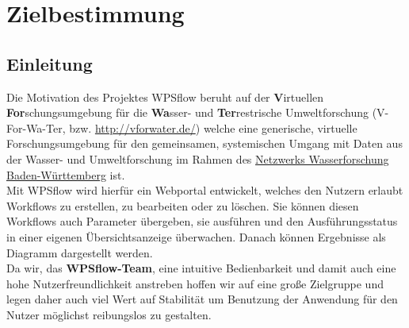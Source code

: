 
 
	\chapter{Zielbestimmung}
	
	    \section{Einleitung}
		    Die Motivation des Projektes WPSflow beruht auf der \textbf{V}irtuellen \textbf{For}schungsumgebung für die \textbf{Wa}sser- und \textbf{Ter}restrische Umweltforschung (V-For-Wa-Ter, bzw. \url{http://vforwater.de/}) welche eine generische, virtuelle Forschungsumgebung für den gemeinsamen, systemischen Umgang mit Daten aus der Wasser- und Umweltforschung im Rahmen des \href{http://www.wassernetzwerk-bw.de/}{Netzwerks Wasserforschung Baden-Württemberg} ist.\\
		    Mit WPSflow wird hierfür ein Webportal entwickelt, welches den Nutzern erlaubt \Gls{Workflow}s zu erstellen, zu bearbeiten oder zu löschen. Sie können diesen Workflows auch Parameter übergeben, sie ausführen und den Ausführungsstatus in einer eigenen Übersichtsanzeige überwachen. Danach können Ergebnisse als Diagramm dargestellt werden.\\
		    Da wir, das \textbf{WPSflow-Team}, eine intuitive Bedienbarkeit und damit auch eine hohe Nutzerfreundlichkeit anstreben hoffen wir auf eine große Zielgruppe und legen daher auch viel Wert auf Stabilität um Benutzung der Anwendung für den Nutzer möglichst reibungslos zu gestalten.
		    
		    \vspace{.5cm}
		    
	    
	    
		
		    
